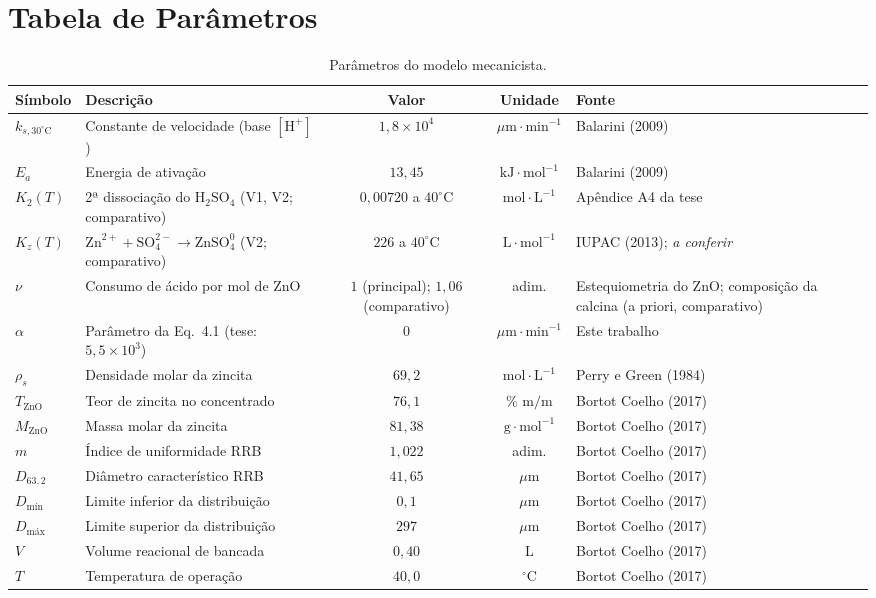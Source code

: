 \documentclass[12pt,a4paper]{article}
\begin{document}
\section{Tabela de Parâmetros}

\begin{table}[htbp]
\centering
\caption{Parâmetros do modelo mecanicista.}
\label{tab:parametros}
\begin{tabularx}{\textwidth}{l l c c l}
\toprule
\textbf{Símbolo} & \textbf{Descrição} & \textbf{Valor} & \textbf{Unidade} & \textbf{Fonte} \\
\midrule
$k_{s,30^\circ\text{C}}$ & Constante de velocidade (base $[\text{H}^+]$) & $1{,}8 \times 10^4$ & $\mu\text{m}\cdot\text{min}^{-1}$ & Balarini (2009) \\
$E_a$ & Energia de ativação & $13{,}45$ & $\text{kJ}\cdot\text{mol}^{-1}$ & Balarini (2009) \\
$K_2(T)$ & 2ª dissociação do $\text{H}_2\text{SO}_4$ (V1, V2; comparativo) & $0{,}00720$ a $40^\circ\text{C}$ & $\text{mol}\cdot\text{L}^{-1}$ & Apêndice A4 da tese \\
$K_z(T)$ & $\text{Zn}^{2+} + \text{SO}_4^{2-} \to \text{ZnSO}_4^0$ (V2; comparativo) & $226$ a $40^\circ\text{C}$ & $\text{L}\cdot\text{mol}^{-1}$ & IUPAC (2013); \textit{a conferir} \\
$\nu$ & Consumo de ácido por mol de ZnO & $1$ (principal); $1{,}06$ (comparativo) & adim. & Estequiometria do ZnO; composição da calcina (a priori, comparativo) \\
$\alpha$ & Parâmetro da Eq.~4.1 (tese: $5{,}5 \times 10^3$) & $0$ & $\mu\text{m}\cdot\text{min}^{-1}$ & Este trabalho \\
$\rho_s$ & Densidade molar da zincita & $69{,}2$ & $\text{mol}\cdot\text{L}^{-1}$ & Perry e Green (1984) \\
$T_{\text{ZnO}}$ & Teor de zincita no concentrado & $76{,}1$ & $\%\text{ m/m}$ & Bortot Coelho (2017) \\
$M_{\text{ZnO}}$ & Massa molar da zincita & $81{,}38$ & $\text{g}\cdot\text{mol}^{-1}$ & Bortot Coelho (2017) \\
$m$ & Índice de uniformidade RRB & $1{,}022$ & adim. & Bortot Coelho (2017) \\
$D_{63{,}2}$ & Diâmetro característico RRB & $41{,}65$ & $\mu\text{m}$ & Bortot Coelho (2017) \\
$D_{\text{mín}}$ & Limite inferior da distribuição & $0{,}1$ & $\mu\text{m}$ & Bortot Coelho (2017) \\
$D_{\text{máx}}$ & Limite superior da distribuição & $297$ & $\mu\text{m}$ & Bortot Coelho (2017) \\
$V$ & Volume reacional de bancada & $0{,}40$ & $\text{L}$ & Bortot Coelho (2017) \\
$T$ & Temperatura de operação & $40{,}0$ & $^\circ\text{C}$ & Bortot Coelho (2017) \\
\bottomrule
\end{tabularx}
\end{table}
\end{document}
